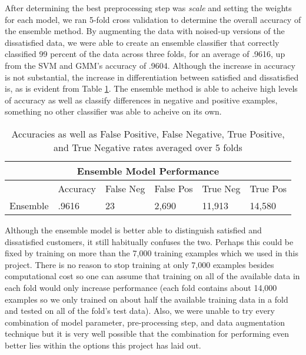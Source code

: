 \documentclass[11pt]{article}
\begin{document}
After determining the best preprocessing step was \textit{scale} and 
setting the weights for each model, we ran 5-fold cross validation to 
determine the overall accuracy of the ensemble method. By augmenting the data 
with noised-up versions of the dissatisfied data, we were able to create an 
ensemble classifier that correctly classified 99 percent of the data across 
three folds, for an average of .9616, up from the SVM and GMM's accuracy of 
.9604. Although the increase in accuracy is not substantial, the increase in 
differentiation between satisfied and dissatisfied is, as is evident from 
Table \ref{table:ensemble}. The ensemble method is able to acheive high 
levels of accuracy as well as classify differences in negative and positive 
examples, something no other classifier was able to acheive on its own. 

\begin{table}
    \captionsetup{width=0.8\textwidth}
    \centering
    \begin{tabular}{ |p{2cm}|p{2cm}|p{2cm}|p{2cm}|p{2cm}|p{2cm}|  }
    \hline
        \multicolumn{6}{|c|}{Ensemble Model Performance} \\
    \hline
        & Accuracy & False Neg & False Pos & True Neg & True Pos \\
    \hline
        Ensemble    & .9616 & 23 & 2,690 & 11,913 & 14,580 \\
    \hline
    \end{tabular}
    \caption{Accuracies as well as False Positive, False Negative, True 
    Positive, and True Negative rates averaged over 5 folds}
    \label{table:ensemble}
\end{table}

Although the ensemble model is better able to distinguish satisfied and 
dissatisfied customers, it still habitually confuses the two. Perhaps this 
could be fixed by training on more than the 7,000 training examples which we 
used in this project. There is no reason to stop training at only 7,000 
examples besides computational cost so one can assume that training on all of 
the available data in each fold would only increase performance (each fold 
contains about 14,000 examples so we only trained on about half the available 
training data in a fold and tested on all of the fold's test data). Also, we 
were unable to try every combination of model parameter, pre-processing step, 
and data augmentation technique but it is very well possible that the 
combination for performing even better lies within the options this project 
has laid out.
\end{document}
